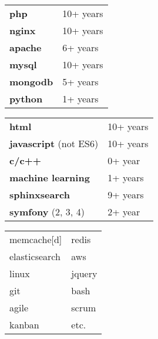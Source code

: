 \documentclass[paper=a4,fontsize=11pt]{eucv}
\begin{document}
\hspace{3mm}
\begin{minipage}[t]{0.33\textwidth} 
	
	\begin{tabular}[t]{ l l }
		\textbf{php} & 10+ years \\
		\textbf{nginx} & 10+ years \\
		\textbf{apache} & 6+ years \\
		\textbf{mysql} & 10+ years \\
		\textbf{mongodb} & 5+ years \\
		\textbf{python} & 1+ years \\
	\end{tabular}
	
	\sepspace
	
\end{minipage}
%
\begin{minipage}[t]{0.33\textwidth} 
	
	\begin{tabular}[t]{ l l }
		\textbf{html} & 10+ years \\
		\textbf{javascript} (not ES6) & 10+ years \\
		\textbf{c/c++} & 0+ year \\
		\textbf{machine learning} & 1+ years \\
		\textbf{sphinxsearch} & 9+ years \\
		\textbf{symfony} (2, 3, 4) & 2+ year
	\end{tabular}
	
	\sepspace
	
\end{minipage}
%
\begin{minipage}[t]{0.33\textwidth} 
	\begin{tabular}[t]{l l}
		memcache[d] & redis \\
		elasticsearch & aws \\
		linux & jquery  \\
		git & bash \\
		agile & scrum  \\
		kanban & etc. \\
	\end{tabular}
\end{minipage}

\noindent

\sepspace
\end{document}
